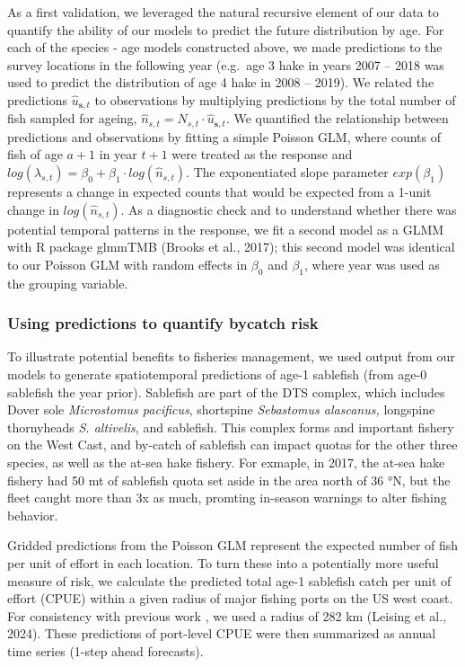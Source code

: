 \documentclass[
]{article}
\begin{document}
As a first validation, we leveraged the natural recursive element of our
data to quantify the ability of our models to predict the future
distribution by age. For each of the species - age models constructed
above, we made predictions to the survey locations in the following year
(e.g.~age 3 hake in years 2007 -- 2018 was used to predict the
distribution of age 4 hake in 2008 -- 2019). We related the predictions
\(\hat{u}_{\boldsymbol{s},t}\) to observations by multiplying
predictions by the total number of fish sampled for ageing,
\(\hat{n}_{s,t} = N_{s,t} \cdot \hat{u}_{\boldsymbol{s},t}\). We
quantified the relationship between predictions and observations by
fitting a simple Poisson GLM, where counts of fish of age \(a+1\) in
year \(t+1\) were treated as the response and
\(log(\lambda_{s,t}) = \beta_{0} + \beta_{1} \cdot log \left( \hat{n}_{s,t} \right)\).
The exponentiated slope parameter \(exp(\beta_{1})\) represents a change
in expected counts that would be expected from a 1-unit change in
\(log(\hat{n}_{s,t})\). As a diagnostic check and to understand whether
there was potential temporal patterns in the response, we fit a second
model as a GLMM with R package glmmTMB (Brooks et al., 2017); this
second model was identical to our Poisson GLM with random effects in
\(\beta_{0}\) and \(\beta_{1}\), where year was used as the grouping
variable.

\subsubsection{Using predictions to quantify bycatch
risk}\label{using-predictions-to-quantify-bycatch-risk}

To illustrate potential benefits to fisheries management, we used output
from our models to generate spatiotemporal predictions of age-1
sablefish (from age-0 sablefish the year prior). Sablefish are part of
the DTS complex, which includes Dover sole \emph{Microstomus pacificus},
shortspine \emph{Sebastomus alascanus,} longspine thornyheads \emph{S.
altivelis}, and sablefish. This complex forms and important fishery on
the West Cast, and by-catch of sablefish can impact quotas for the other
three species, as well as the at-sea hake fishery. For exmaple, in 2017,
the at-sea hake fishery had 50 mt of sablefish quota set aside in the
area north of 36 °N, but the fleet caught more than 3x as much, promting
in-season warnings to alter fishing behavior.

Gridded predictions from the Poisson GLM represent the expected number
of fish per unit of effort in each location. To turn these into a
potentially more useful measure of risk, we calculate the predicted
total age-1 sablefish catch per unit of effort (CPUE) within a given
radius of major fishing ports on the US west coast. For consistency with
previous work , we used a radius of 282 km (Leising et al., 2024). These
predictions of port-level CPUE were then summarized as annual time
series (1-step ahead forecasts).
\end{document}
